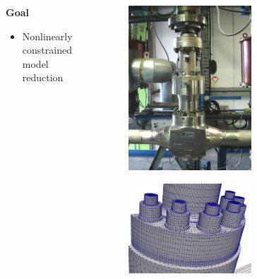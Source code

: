 \documentclass[a4paper,10pt]{beamer}
\begin{document}
\begin{frame}
\begin{columns}
\begin{column}{9cm}
{\bfseries Goal}
\begin{itemize} 
    \item Nonlinearly constrained model reduction
\end{itemize}
\end{column}
\hspace{-1.2cm}
\begin{column}{5cm}
\vspace{-0.5cm}
\begin{figure}[h!]\includegraphics[width=0.6\textwidth]{./images/real_valve.png} 
\captionsetup{justification=centering,margin=0cm}
\centering 
\end{figure}
\vspace{-0.3cm}
\begin{figure}[h!]\includegraphics[width=0.6\textwidth]{./images/intro_contact.png} 
\captionsetup{justification=centering,margin=0cm}
\centering 
\end{figure}
\end{column}
\end{columns}
\end{frame}
\end{document}
